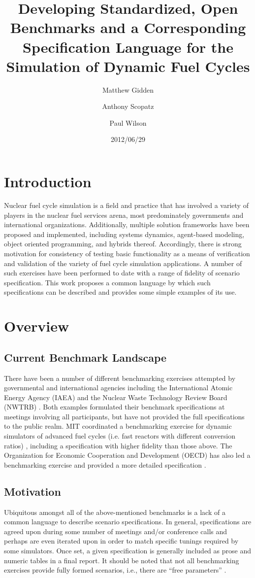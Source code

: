 \documentclass{anstrans}
\title{Developing Standardized, Open Benchmarks and a Corresponding 
Specification Language for the Simulation of Dynamic Fuel Cycles}
\author[*]{Matthew Gidden}
\author[$\dag$]{Anthony Scopatz}
\author[*]{Paul Wilson}
\affil[*]{Department of Nuclear Engineering \& Engineering Physics, 
University of Wisconsin - Madison, Madison, WI, 53703}
\affil[$\dag$]{The Flash Center for Computational Science, University 
of Chicago, Chicago, IL, 60637}
\date{2012/06/29}
\begin{document}
\section{Introduction}
Nuclear fuel cycle simulation is a field and practice that has involved a
variety of players in the nuclear fuel services arena, most predominately
governments and international organizations.  Additionally, multiple solution
frameworks have been proposed and implemented, including systems dynamics,
agent-based modeling, object oriented programming, and hybrids
thereof. Accordingly, there is strong motivation for consistency of testing
basic functionality as a means of verification and validation of the variety of
fuel cycle simulation applications. A number of such exercises have been
performed to date with a range of fidelity of scenario specification. This work
proposes a common language by which such specifications can be described and
provides some simple examples of its use.

\section{Overview}

\subsection{Current Benchmark Landscape}
There have been a number of different benchmarking exercises attempted by
governmental and international agencies including the International Atomic
Energy Agency (IAEA) \cite{_international_2011} and the Nuclear Waste Technology
Review Board (NWTRB) \cite{_nuclear_2011}.  Both examples formulated their
benchmark specifications at meetings involving all participants, but have not
provided the full specifications to the public realm. MIT coordinated a
benchmarking exercise for dynamic simulators of advanced fuel cycles (i.e. fast
reactors with different conversion ratios) \cite{guerin_benchmark_2009},
including a specification with higher fidelity than those above. The
Organization for Economic Cooperation and Development (OECD) has also led a
benchmarking exercise \cite{boucher_benchmark_2012} and provided a more detailed
specification \cite{boucher_specification_2008}. 

\subsection{Motivation}
Ubiquitous amongst all of the above-mentioned benchmarks is a lack of a common
language to describe scenario specifications. In general, specifications are
agreed upon during some number of meetings and/or conference calls and perhaps
are even iterated upon in order to match specific tunings required by some
simulators. Once set, a given specification is generally included as prose and
numeric tables in a final report. It should be noted that not all benchmarking
exercises provide fully formed scenarios, i.e., there are ``free parameters''
\cite{scopatz_fuel_2011}.
\end{document}
